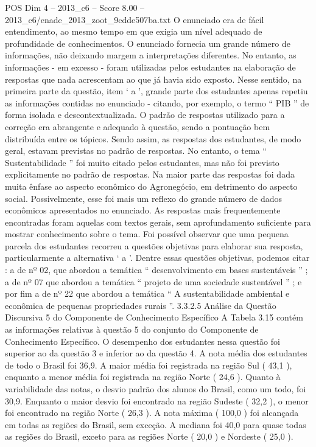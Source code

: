 \begin{textsample}{POS Dim 4 – 2013\_c6 – Score 8.00 – 2013\_c6/enade\_2013\_zoot\_9cdde507ba.txt}
O enunciado era de fácil entendimento, ao mesmo tempo em que exigia um nível adequado de profundidade de conhecimentos.
O enunciado fornecia um grande número de informações, não deixando margem a interpretações diferentes.
No entanto, as informações - em excesso - foram utilizadas pelos estudantes na elaboração de respostas que nada acrescentam ao que já havia sido exposto.
Nesse sentido, na primeira parte da questão, item ‘ a ’, grande parte dos estudantes apenas repetiu as informações contidas no enunciado - citando, por exemplo, o termo “ PIB ” de forma isolada e descontextualizada.
O padrão de respostas utilizado para a correção era abrangente e adequado à questão, sendo a pontuação bem distribuída entre os tópicos.
Sendo assim, as respostas dos estudantes, de modo geral, estavam previstas no padrão de respostas.
No entanto, o tema “ Sustentabilidade ” foi muito citado pelos estudantes, mas não foi previsto explicitamente no padrão de respostas.
Na maior parte das respostas foi dada muita ênfase ao aspecto econômico do Agronegócio, em detrimento do aspecto social.
Possivelmente, esse foi mais um reflexo do grande número de dados econômicos apresentados no enunciado.
As respostas mais frequentemente encontradas foram aquelas com textos gerais, sem aprofundamento suficiente para mostrar conhecimento sobre o tema.
Foi possível observar que uma pequena parcela dos estudantes recorreu a questões objetivas para elaborar sua resposta, particularmente a alternativa ‘ a ’.
Dentre essas questões objetivas, podemos citar : a de nº 02, que abordou a temática “ desenvolvimento em bases sustentáveis ” ; a de nº 07 que abordou a temática “ projeto de uma sociedade sustentável ” ; e por fim a de nº 22 que abordou a temática “ A sustentabilidade ambiental e econômica de pequenas propriedades rurais ”. 3.3.2.5 Análise da Questão Discursiva 5 do Componente de Conhecimento Específico A Tabela 3.15 contém as informações relativas à questão 5 do conjunto do Componente de Conhecimento Específico.
O desempenho dos estudantes nessa questão foi superior ao da questão 3 e inferior ao da questão 4.
A nota média dos estudantes de todo o Brasil foi 36,9.
A maior média foi registrada na região Sul ( 43,1 ), enquanto a menor média foi registrada na região Norte ( 24,6 ).
Quanto à variabilidade das notas, o desvio padrão dos alunos do Brasil, como um todo, foi 30,9.
Enquanto o maior desvio foi encontrado na região Sudeste ( 32,2 ), o menor foi encontrado na região Norte ( 26,3 ).
A nota máxima ( 100,0 ) foi alcançada em todas as regiões do Brasil, sem exceção.
A mediana foi 40,0 para quase todas as regiões do Brasil, exceto para as regiões Norte ( 20,0 ) e Nordeste ( 25,0 ).

\end{textsample}
